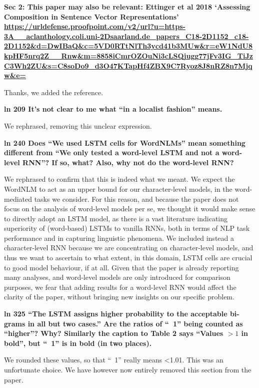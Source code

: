\documentclass{article}
\begin{document}
\textbf{Sec 2: This paper may also be relevant: Ettinger et al 2018 `Assessing Composition in Sentence Vector Representations'
\url{https://urldefense.proofpoint.com/v2/url?u=https-3A__aclanthology.coli.uni-2Dsaarland.de_papers_C18-2D1152_c18-2D1152&d=DwIBaQ&c=5VD0RTtNlTh3ycd41b3MUw&r=eW1NdU8kpHF5nrq2Z__Rnw&m=8858iCmrOZOuNi3cLSQjugg77jFv3IG_TiJzC3Wh2ZU&s=C8soDo9_d3O47KTapHf4ZBX9C7Ryoz8J8nRZ8n7Mjqw&e=}}

Thanks, we added the reference.
\newline

\textbf{ln 209 It's not clear to me what ``in a localist fashion'' means.}

We rephrased, removing this unclear expression.
\newline

\textbf{ln 240 Does ``We used LSTM cells for WordNLMs'' mean something different from ``We only tested a word-level LSTM and not a word-level RNN''? If so, what?  Also, why not do the word-level RNN?}

We rephrased to confirm that this is indeed what we meant. We expect the WordNLM to act as an upper bound for our character-level models, in the word-mediated tasks we consider. For this reason, and because the paper does not focus on the analysis of word-level models per se, we thought it would make sense to directly adopt an LSTM model, as there is a vast literature indicating superiority of (word-based) LSTMs to vanilla RNNs, both in terms of NLP task performance and in capturing linguistic phenomena. We included instead a character-level RNN because we are concentrating on character-level models, and thus we want to ascertain to what extent, in this domain, LSTM cells are crucial to good model behaviour, if at all. Given that the paper is already reporting many analyses, and word-level models are only introduced for comparison purposes, we fear that adding results for a word-level RNN would affect the clarity of the paper, without bringing new insights on our specific problem.
\newline

\textbf{ln 325 ``The LSTM assigns higher probability to the acceptable bi-grams in all but two cases.'' Are the ratios of ``~1'' being counted as ``higher''? Why?  Similarly the caption to Table 2 says ``Values $> 1$ in bold'', but ``~1'' is in bold (in two places).}

We rounded these values, so that ``~1'' really means <1.01. This was an unfortunate choice. We have however now entirely removed this section from the paper.
\newline
\end{document}

